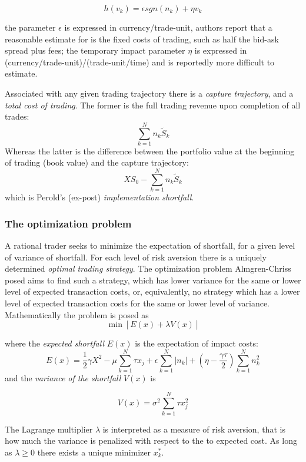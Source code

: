 \[ h(v_{k}) = \epsilon sgn(n_{k}) + \eta v_{k} \]

the parameter \(\epsilon\) is expressed in currency/trade-unit, authors
report that a reasonable estimate for is the fixed costs of trading,
such as half the bid-ask spread plus fees; the temporary impact
parameter \(\eta\) is expressed in
(currency/trade-unit)/(trade-unit/time) and is reportedly more difficult
to estimate.

Associated with any given trading trajectory there is a
\emph{capture trajectory}, and a \emph{total cost of trading}. The
former is the full trading revenue upon completion of all trades:
\[ \sum_{k=1}^{N}{n_{k}  \tilde{S}_{k}} \] Whereas the latter is the
difference between the portfolio value at the beginning of trading (book
value) and the capture trajectory:
\[ XS_{0} - \sum_{k=1}^{N}{n_{k} \tilde{S}_{k}} \] which is Perold's
(ex-post) \emph{implementation shortfall}.

\hypertarget{the-optimization-problem}{%
\subsubsection{The optimization
problem}\label{the-optimization-problem}}

A rational trader seeks to minimize the expectation of shortfall, for a
given level of variance of shortfall. For each level of risk aversion
there is a uniquely determined \emph{optimal trading strategy}. The
optimization problem Almgren-Chriss posed aims to find such a strategy,
which has lower variance for the same or lower level of expected
transaction costs, or, equivalently, no strategy which has a lower level
of expected transaction costs for the same or lower level of variance.
Mathematically the problem is posed as \[ \min[E(x) + \lambda V(x)] \]

where the \emph{expected shortfall} \(E(x)\) is the expectation of
impact costs:
\[ E(x) = \frac{1}{2}\gamma X^2 - \mu\sum_{k=1}^{N}{\tau x_{j}} + \epsilon\sum_{k=1}^{N}{|n_{k}|} + (\eta - \frac{\gamma\tau}{2})\sum_{k=1}^{N}{n_{k}^2} \]
and the \emph{variance of the shortfall} \(V(x)\) is

\[ V(x) = \sigma^2 \sum_{k=1}^{N}{\tau x_{j}^2} \]

The Lagrange multiplier \(\lambda\) is interpreted as a measure of risk
aversion, that is how much the variance is penalized with respect to the
to expected cost. As long as \(\lambda \geq 0\) there exists a unique
minimizer \(x_{k}^{*}\).

